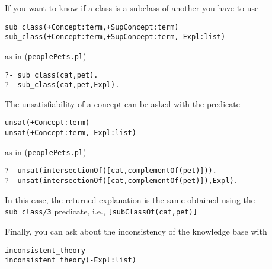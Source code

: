 If you want to know if a class is a subclass of another you have to use
\begin{verbatim}
sub_class(+Concept:term,+SupConcept:term)
sub_class(+Concept:term,+SupConcept:term,-Expl:list)
\end{verbatim}
as in (\href{http://trill.lamping.unife.it/example/trill/peoplePets.pl}{\texttt{peoplePets.pl}})
\begin{verbatim}
?- sub_class(cat,pet).
?- sub_class(cat,pet,Expl).
\end{verbatim}

The unsatisfiability of a concept can be asked with the predicate
\begin{verbatim}
unsat(+Concept:term)
unsat(+Concept:term,-Expl:list)
\end{verbatim}
as in (\href{http://trill.lamping.unife.it/example/trill/peoplePets.pl}{\texttt{peoplePets.pl}})
\begin{verbatim}
?- unsat(intersectionOf([cat,complementOf(pet)])).
?- unsat(intersectionOf([cat,complementOf(pet)]),Expl).
\end{verbatim}
In this case, the returned explanation is the same obtained using the \verb|sub_class/3| predicate, i.e., \verb|[subClassOf(cat,pet)]|

Finally, you can ask about the inconsistency of the knowledge base with
\begin{verbatim}
inconsistent_theory
inconsistent_theory(-Expl:list)
\end{verbatim}